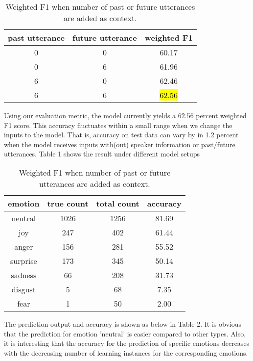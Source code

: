 \documentclass[11pt]{article}
\begin{document}
\begin{table}[hbt]
  \centering
  \begin{tabular}{c|c|c}
    past utterance & future utterance & weighted F1 \\
    \hline
    0 & 0 & 60.17 \\
    \hline
    0 & 6 & 61.96 \\
    \hline
    6 & 0 & 62.46 \\
    \hline
    6 & 6 & \hl{62.56} \\
  \end{tabular}
  \caption{Weighted F1 when number of past or future utterances are added as context.}
\end{table}

Using our evaluation metric, the model currently yields a 62.56 percent weighted F1 score. This accuracy fluctuates within a small range when we change the inputs to the model. That is, accuracy on test data can vary by in 1.2 percent when the model receives inputs with(out) speaker information or past/future utterances. Table 1 shows the result under different model setups

\begin{table}[hbt]
  \centering
  \begin{tabular}{c|c|c|c}
    emotion & true count & total count & accuracy \\
    \hline
    neutral & 1026 & 1256 & 81.69 \\
    \hline
    joy & 247 & 402 & 61.44 \\
    \hline
    anger & 156 & 281 & 55.52 \\
    \hline
    surprise & 173 & 345 & 50.14 \\
    \hline
    sadness & 66 & 208 & 31.73 \\
    \hline
    disgust & 5 & 68 & 7.35 \\
    \hline
    fear & 1 & 50 & 2.00 \\
  \end{tabular}
  \caption{Weighted F1 when number of past or future utterances are added as context.}
\end{table}

The prediction output and accuracy is shown as below in Table 2. It is obvious that the prediction for emotion 'neutral' is easier compared to other types. Also, it is interesting that the accuracy for the prediction of specific emotions decreases with the decreasing number of learning instances for the corresponding emotions. 
\end{document}
